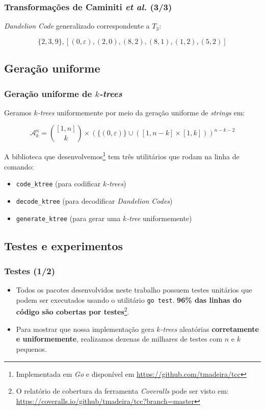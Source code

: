 \documentclass{beamer}
\begin{document}
  \begin{frame}
    \frametitle{Transformações de Caminiti \emph{et al.} (3/3)}

    \emph{Dandelion Code} generalizado correspondente a $T_3$:

    $$
    \{2,3,9\},
    [(0, \varepsilon), (2, 0), (8, 2), (8, 1), (1, 2), (5, 2)]
    $$
  \end{frame}

  \subsection{Geração uniforme}

  \begin{frame}
    \frametitle{Geração uniforme de \emph{$k$-trees}}

    Geramos \emph{$k$-trees} uniformemente por meio da geração uniforme de \emph{strings} em:

    $$
    \mathcal{A}^n_k = { [1,n] \choose k } \times (\{ ( 0, \varepsilon ) \} \cup ([1,n-k] \times [1,k]))^{n-k-2}
    $$

    A biblioteca que desenvolvemos\footnote{\scriptsize Implementada em \emph{Go} e disponível em \url{https://github.com/tmadeira/tcc}} tem três utilitários que rodam na linha de comando:

    {\footnotesize
      \begin{itemize}
        \item {\tt code\_ktree} (para codificar \emph{$k$-trees})
        \item {\tt decode\_ktree} (para decodificar \emph{Dandelion Codes})
        \item {\tt generate\_ktree} (para gerar uma \emph{$k$-tree} uniformemente)
      \end{itemize}
    }
  \end{frame}

  \subsection{Testes e experimentos}

  \begin{frame}
    \frametitle{Testes (1/2)}

    \begin{itemize}
      \item Todos os pacotes desenvolvidos neste trabalho possuem testes unitários que podem ser executados usando o utilitário {\tt go test}. \textbf{96\% das linhas do código são cobertas por testes}\footnote{\scriptsize O relatório de cobertura da ferramenta \emph{Coveralls} pode ser visto em: \url{https://coveralls.io/github/tmadeira/tcc?branch=master}}.
      \item Para mostrar que nossa implementação gera \emph{$k$-trees} aleatórias \textbf{corretamente e uniformemente}, realizamos dezenas de milhares de testes com $n$ e $k$ pequenos.
    \end{itemize}
  \end{frame}
\end{document}
